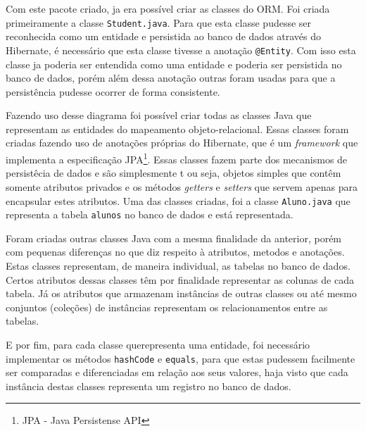 		
	\par Com este pacote criado, ja era possível criar as classes do ORM. Foi
criada primeiramente a classe \texttt{Student.java}. Para que esta classe
pudesse ser reconhecida como um entidade e persistida ao banco de dados através
do Hibernate, é necessário que esta classe tivesse a anotação
\texttt{@Entity}. Com isso esta classe ja poderia ser entendida como uma
entidade e poderia ser persistida no banco de dados, porém além dessa anotação
outras foram usadas para que a persistência pudesse ocorrer de forma
consistente.





	
	
			
	
		\par Fazendo uso desse diagrama foi possível criar todas as classes 
	Java que representam as entidades do mapeamento objeto-relacional. 
	Essas classes foram criadas fazendo uso de anotações próprias do
	Hibernate, que é um \textit{framework} que implementa a especificação
	JPA\footnote{JPA - Java Persistense API}. Essas classes fazem parte
	dos mecanismos de persistêcia de dados e são simplesmente t ou seja, objetos
	simples que contêm somente atributos privados e os métodos \textit{getters} e
	\textit{setters} que servem apenas para encapsular estes atributos. Uma das
	classes criadas, foi a classe \texttt{Aluno.java} que representa a tabela
	\texttt{alunos} no banco de dados e está representada.
		
		\par Foram criadas outras classes Java com a mesma finalidade da
	anterior, porém com pequenas diferenças no que diz respeito à atributos,
	metodos e anotações. Estas classes representam, de maneira individual, as
	tabelas no banco de dados. Certos atributos dessas classes têm por finalidade
	representar as colunas de cada tabela. Já os atributos que armazenam instâncias
	de outras classes ou até mesmo conjuntos (coleções) de instâncias representam os
	relacionamentos entre as tabelas. 
	
		\par E por fim, para cada classe querepresenta uma 	entidade, foi necessário
	implementar os métodos \texttt{hashCode} e \texttt{equals}, para que estas
	pudessem facilmente ser comparadas e diferenciadas em relação aos seus
	valores, haja visto que cada instância destas classes representa um registro
	no banco de dados.
		
